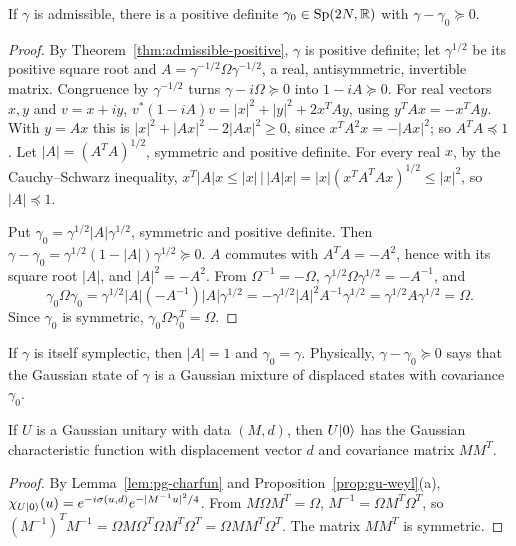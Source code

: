 \begin{veteenv}
\begin{lemma}\label{lem:pg-minorant}
If $\gamma$ is admissible, there is a positive definite $\gamma_0\in\mathrm{Sp}(2N,\mathbb R)$ with $\gamma-\gamma_0\succeq0$.
\end{lemma}

\begin{proof}
By Theorem~\ref{thm:admissible-positive}, $\gamma$ is positive definite; let $\gamma^{1/2}$ be its positive square root and
$A=\gamma^{-1/2}\Omega\gamma^{-1/2}$, a real, antisymmetric, invertible matrix. Congruence by $\gamma^{-1/2}$ turns $\gamma-i\Omega\succeq0$ into
$1-iA\succeq0$. For real vectors $x,y$ and $v=x+iy$, $v^*(1-iA)v=\lvert x\rvert^2+\lvert y\rvert^2+2x^TAy$, using $y^TAx=-x^TAy$. With $y=Ax$ this
is $\lvert x\rvert^2+\lvert Ax\rvert^2-2\lvert Ax\rvert^2\ge0$, since $x^TA^2x=-\lvert Ax\rvert^2$; so $A^TA\preceq1$. Let $\lvert A\rvert=(A^TA)^{1/2}$,
symmetric and positive definite. For every real $x$, by the Cauchy--Schwarz inequality,
$x^T\lvert A\rvert x\le\lvert x\rvert\,\lvert\,\lvert A\rvert x\rvert=\lvert x\rvert(x^TA^TAx)^{1/2}\le\lvert x\rvert^2$, so $\lvert A\rvert\preceq1$.

Put $\gamma_0=\gamma^{1/2}\lvert A\rvert\gamma^{1/2}$, symmetric and positive definite. Then $\gamma-\gamma_0=\gamma^{1/2}(1-\lvert A\rvert)\gamma^{1/2}\succeq0$.
$A$ commutes with $A^TA=-A^2$, hence with its square root $\lvert A\rvert$, and $\lvert A\rvert^2=-A^2$. From $\Omega^{-1}=-\Omega$,
$\gamma^{1/2}\Omega\gamma^{1/2}=-A^{-1}$, and
\[
 \gamma_0\Omega\gamma_0=\gamma^{1/2}\lvert A\rvert(-A^{-1})\lvert A\rvert\gamma^{1/2}=-\gamma^{1/2}\lvert A\rvert^2A^{-1}\gamma^{1/2}
 =\gamma^{1/2}A\gamma^{1/2}=\Omega .
\]
Since $\gamma_0$ is symmetric, $\gamma_0\Omega\gamma_0^T=\Omega$.
\end{proof}

If $\gamma$ is itself symplectic, then $\lvert A\rvert=1$ and $\gamma_0=\gamma$. Physically, $\gamma-\gamma_0\succeq0$ says that the Gaussian state of
$\gamma$ is a Gaussian mixture of displaced states with covariance $\gamma_0$.

\begin{theorem}\label{thm:pg-vacuum}
If $U$ is a Gaussian unitary with data $(M,d)$, then $U\lvert 0\rangle$ has the Gaussian characteristic function with displacement vector $d$ and
covariance matrix $MM^T$.
\end{theorem}

\begin{proof}
By Lemma~\ref{lem:pg-charfun} and Proposition~\ref{prop:gu-weyl}(a), $\chi_{U\lvert 0\rangle}(u)=e^{-i\sigma(u,d)}e^{-\lvert M^{-1}u\rvert^2/4}$. From
$M\Omega M^T=\Omega$, $M^{-1}=\Omega M^T\Omega^T$, so $(M^{-1})^TM^{-1}=\Omega M\Omega^T\Omega M^T\Omega^T=\Omega MM^T\Omega^T$. The matrix $MM^T$ is
symmetric.
\end{proof}


\end{veteenv}
